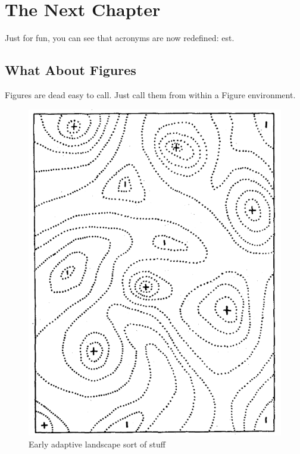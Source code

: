 \chapter{The Next Chapter} 
\label{nextChapt} 

Just for fun, you can see that acronyms are now redefined: \ac{est}.

\section{What About Figures}

Figures are dead easy to call. Just call them from within a Figure environment.

\begin{figure}[h] %
	\centering
	\includegraphics[scale=0.4]{Figs/Wright_1932_1.pdf}
    \caption[Adaptive landscape]{Early adaptive landscape sort of stuff}
    \label{landscape}
\end{figure}

